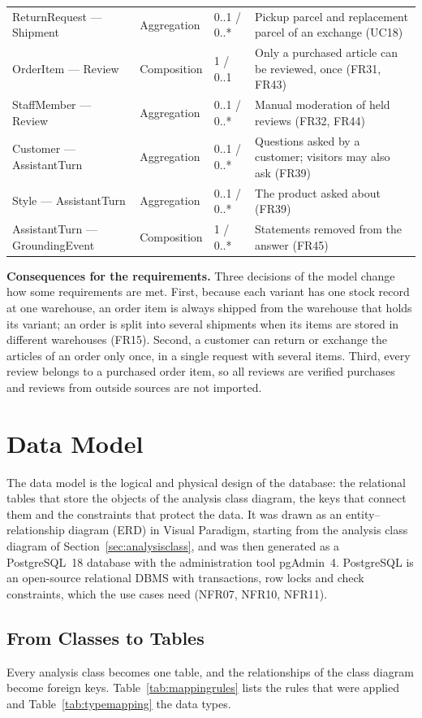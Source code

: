 {\begin{xltabular}{\textwidth}{@{}L{4.4cm} L{2.1cm} L{1.7cm} Y@{}}
ReturnRequest --- Shipment & Aggregation & 0..1 / 0..* & Pickup parcel and replacement parcel of an exchange (UC18) \\
OrderItem --- Review & Composition & 1 / 0..1 & Only a purchased article can be reviewed, once (FR31, FR43) \\
StaffMember --- Review & Aggregation & 0..1 / 0..* & Manual moderation of held reviews (FR32, FR44) \\
Customer --- AssistantTurn & Aggregation & 0..1 / 0..* & Questions asked by a customer; visitors may also ask (FR39) \\
Style --- AssistantTurn & Aggregation & 0..1 / 0..* & The product asked about (FR39) \\
AssistantTurn --- GroundingEvent & Composition & 1 / 0..* & Statements removed from the answer (FR45) \\
\end{xltabular}
}

\textbf{Consequences for the requirements.} Three decisions of the model change how some requirements are met. First, because each variant has one stock record at one warehouse, an order item is always shipped from the warehouse that holds its variant; an order is split into several shipments when its items are stored in different warehouses (FR15). Second, a customer can return or exchange the articles of an order only once, in a single request with several items. Third, every review belongs to a purchased order item, so all reviews are verified purchases and reviews from outside sources are not imported.

\section{Data Model}
\label{sec:datamodel}

The data model is the logical and physical design of the database: the relational tables that store the objects of the analysis class diagram, the keys that connect them and the constraints that protect the data. It was drawn as an entity--relationship diagram (ERD) in Visual Paradigm, starting from the analysis class diagram of Section~\ref{sec:analysisclass}, and was then generated as a PostgreSQL~18 database with the administration tool pgAdmin~4. PostgreSQL is an open-source relational DBMS with transactions, row locks and check constraints, which the use cases need (NFR07, NFR10, NFR11).

\subsection{From Classes to Tables}
\label{subsec:mapping}
Every analysis class becomes one table, and the relationships of the class diagram become foreign keys. Table~\ref{tab:mappingrules} lists the rules that were applied and Table~\ref{tab:typemapping} the data types.

